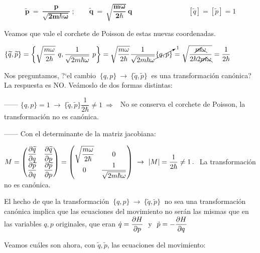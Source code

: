 \vspace{5mm}
\begin{definition}
	
	\begin{equation}
	\label{T23ROAqptildes}
	\boldsymbol{
	\widetilde p \ = \  \dfrac{p}{\sqrt{2m\hbar \omega}} \ ; \qquad  
	\widetilde q \ = \  \sqrt{\dfrac{m\omega}{2\hbar}}\  q  
	}
	\qquad \qquad \qquad \qquad [\widetilde q ]=[\widetilde p ]=1
	\end{equation}
\end{definition}

\vspace{5mm} Veamos que vale el corchete de Poisson de estas nuevas coordenadas.
 
$\{\widetilde q,\widetilde p \}=\left\{ \sqrt{\dfrac{m\omega}{2\hbar}}\  q  , \dfrac{1}{\sqrt{2m\hbar \omega}}\ p  \right\} = \sqrt{\dfrac{m\omega}{2\hbar}} \dfrac{1}{\sqrt{2m\hbar \omega}} \cancelto{1}{\{q,p\}} =\sqrt{\dfrac{\cancel{m} \bcancel{\omega}}{2\hbar 2 \cancel{m} \bcancel{ \omega}}} = \dfrac 1{2\hbar}$

\vspace{5mm} Nos preguntamos, ?`el cambio $\ \{q,p\} \ \to \ \{\widetilde q, \widetilde p \} \ $ es una transformación canónica? La respuesta es NO. Veámoslo de dos formas distintas:

------ $\{q,p\}= 1 \ \to \ \{\widetilde q,\widetilde p \} \dfrac 1{2\hbar} \neq 1 \ \Rightarrow \ \ $ No se conserva el corchete de Poisson, la transformación no es canónica.

------ Con el determinante de la matriz jacobiana:

$M=\mqty( \displaystyle \pdv{\widetilde q}{q} & \displaystyle \pdv{\widetilde q}{p} \\ \displaystyle \pdv{\widetilde p}{q} & \displaystyle \pdv{\widetilde p}{p} )=\mqty( \sqrt{\dfrac{m\omega}{2\hbar}} & 0 \\ 0 & \dfrac{1}{\sqrt{2m\hbar \omega}}) \ \to \ |M|=\dfrac 1 {2\hbar} \neq 1\, . \ $  La transformación no es canónica.


El hecho de que la transformación $\ \{q,p\} \ \to \ \{\widetilde q, \widetilde p \} \ $ no sea una transformación canónica implica que las ecuaciones del movimiento no serán las mismas que en las variables $q,p$ originales, que eran $\dot q=\displaystyle \pdv{H}{p}\ $ y $\ \dot p=-\displaystyle \pdv{H}{q}$

\vspace{5mm} Veamos cuáles son ahora, con $\widetilde q, \widetilde p$, las ecuaciones del movimiento:


